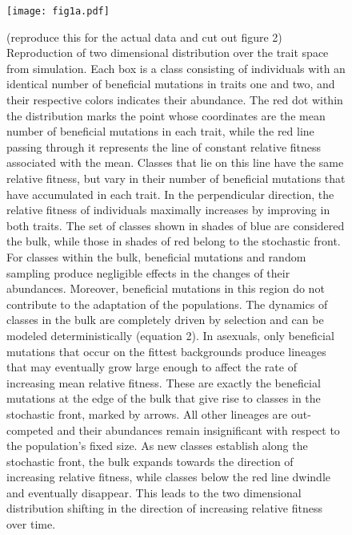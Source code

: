 \documentclass[11pt,twocolumn]{article}
\begin{document}
\begin{figure}
\texttt{[image: fig1a.pdf]}
\label{Figure 1.}
% 
% 
\caption{\footnotesize (reproduce this for the actual data and cut out figure 2) Reproduction of two dimensional distribution over the trait space from simulation. Each box is a class consisting of individuals with an identical number of beneficial mutations in traits one and two, and their respective colors indicates their abundance. The red dot within the distribution marks the point whose coordinates are the mean number of beneficial mutations in each trait, while the red line passing through it represents the line of constant relative fitness associated with the mean. Classes that lie on this line have the same relative fitness, but vary in their number of beneficial mutations that have accumulated in each trait. In the perpendicular direction, the relative fitness of individuals maximally increases by improving in both traits. The set of classes shown in shades of blue are considered the bulk, while those in shades of red belong to the stochastic front. For classes within the bulk, beneficial mutations and random sampling produce negligible effects in the changes of their abundances.  Moreover, beneficial mutations in this region do not contribute to the adaptation of the populations. The dynamics of classes in the bulk are completely driven by selection and can be modeled deterministically (equation 2). In asexuals, only beneficial mutations that occur on the fittest backgrounds produce lineages that may eventually grow large enough to affect the rate of increasing mean relative fitness. These are exactly the beneficial mutations at the edge of the bulk that give rise to classes in the stochastic front, marked by arrows. All other lineages are out-competed and their abundances remain insignificant with respect to the population's fixed size. As new classes establish along the stochastic front, the bulk expands towards the direction of increasing relative fitness, while classes below the red line dwindle and eventually disappear. This leads to the two dimensional distribution shifting in the direction of increasing relative fitness over time.}
\end{figure}
\end{document}
